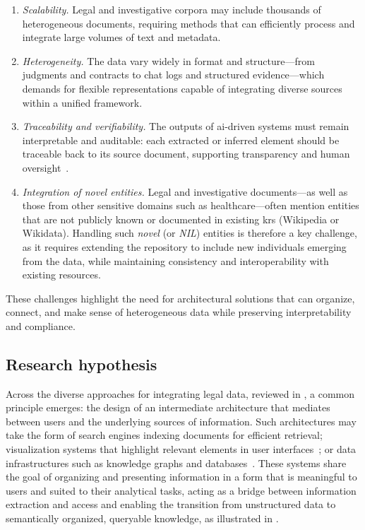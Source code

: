 \begin{enumerate}[leftmargin=*,label=\textit{Ch.~\arabic*:},ref=\textit{Ch.~\arabic*}]
    \item \label{ch:scalability} \emph{Scalability.} Legal and investigative corpora may include thousands of heterogeneous documents, requiring methods that can efficiently process and integrate large volumes of text and metadata.
    \item \label{ch:heterogeneity} \emph{Heterogeneity.} The data vary widely in format and structure---from judgments and contracts to chat logs and structured evidence---which demands for flexible representations capable of integrating diverse sources within a unified framework.
    \item \label{ch:traceability} \emph{Traceability and verifiability.} The outputs of \ac{ai}-driven systems must remain interpretable and auditable: each extracted or inferred element should be traceable back to its source document, supporting transparency and human oversight~\cite[Art.~14--15]{ai_act}.
    \item \label{ch:nilintegration} \emph{Integration of novel entities.}
    Legal and investigative documents---as well as those from other sensitive domains such as healthcare---often mention entities that are not publicly known or documented in existing \aclp{kr} (\eg Wikipedia or Wikidata). Handling such \emph{novel} (or \emph{NIL}) entities is therefore a key challenge, as it requires extending the repository to include new individuals emerging from the data, while maintaining consistency and interoperability with existing resources.
\end{enumerate}

These challenges highlight the need for architectural solutions that can organize, connect, and make sense of heterogeneous data while preserving interpretability and compliance.


\subsection{Research hypothesis}



Across the diverse approaches for integrating legal data, reviewed in , a common principle emerges: the design of an intermediate architecture that mediates between users and the underlying sources of information. Such architectures may take the form of search engines indexing documents for efficient retrieval; visualization systems that highlight relevant elements in user interfaces~\cite{pirzada2024framework,P_rez_2021,kejriwal2018,swoopes2025interfacedesignsupportlegal,ziwei_abstractexplorer_2025,raymond_skimming_sci_2023}; or data infrastructures such as knowledge graphs and databases~\cite{kejriwal2017searchengine,kejriwal2018,szekely2015building,amato2008,HAN2024121052legalasst,bellandi2025streamlining}. These systems share the goal of organizing and presenting information in a form that is meaningful to users and suited to their analytical tasks, acting as a bridge between information extraction and access and enabling the transition from unstructured data to semantically organized, queryable knowledge, as illustrated in .

